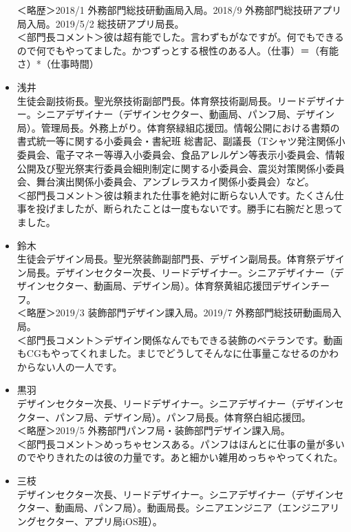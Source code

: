 \documentclass[dvipdfmx,jb5]{jreport}
\begin{document}
\begin{itemize}
            ＜略歴＞2018/1 外務部門総技研動画局入局。2018/9 外務部門総技研アプリ局入局。2019/5/2 総技研アプリ局長。\\
            ＜部門長コメント＞彼は超有能でした。言わずもがなですが。何でもできるので何でもやってました。かつずっとする根性のある人。（仕事）＝（有能さ）*（仕事時間）
      \item 浅井\\
            生徒会副技術長。聖光祭技術副部門長。体育祭技術副局長。リードデザイナー。シニアデザイナー（デザインセクター、動画局、パンフ局、デザイン局）。管理局長。外務上がり。体育祭緑組応援団。情報公開における書類の書式統一等に関する小委員会・書紀班 総書記、副議長（Tシャツ発注関係小委員会、電子マネー等導入小委員会、食品アレルゲン等表示小委員会、情報公開及び聖光祭実行委員会細則制定に関する小委員会、震災対策関係小委員会、舞台演出関係小委員会、アンブレラスカイ関係小委員会）など。\\
            ＜部門長コメント＞彼は頼まれた仕事を絶対に断らない人です。たくさん仕事を投げましたが、断られたことは一度もないです。勝手に右腕だと思ってました。
      \item 鈴木\\
            生徒会デザイン局長。聖光祭装飾副部門長、デザイン副局長。体育祭デザイン局長。デザインセクター次長、リードデザイナー。シニアデザイナー（デザインセクター、動画局、デザイン局）。体育祭黄組応援団デザインチーフ。\\
            ＜略歴＞2019/3 装飾部門デザイン課入局。2019/7 外務部門総技研動画局入局。\\
            ＜部門長コメント＞デザイン関係なんでもできる装飾のベテランです。動画もCGもやってくれました。まじでどうしてそんなに仕事量こなせるのかわからない人の一人です。
      \item 黒羽\\
            デザインセクター次長、リードデザイナー。シニアデザイナー（デザインセクター、パンフ局、デザイン局）。パンフ局長。体育祭白組応援団。\\
            ＜略歴＞2019/5 外務部門パンフ局・装飾部門デザイン課入局。\\
            ＜部門長コメント＞めっちゃセンスある。パンフはほんとに仕事の量が多いのでやりきれたのは彼の力量です。あと細かい雑用めっちゃやってくれた。
      \item 三枝\\
            デザインセクター次長、リードデザイナー。シニアデザイナー（デザインセクター、動画局、パンフ局）。動画局長。シニアエンジニア（エンジニアリングセクター、アプリ局iOS班）。\\

\end{itemize}
\end{document}
